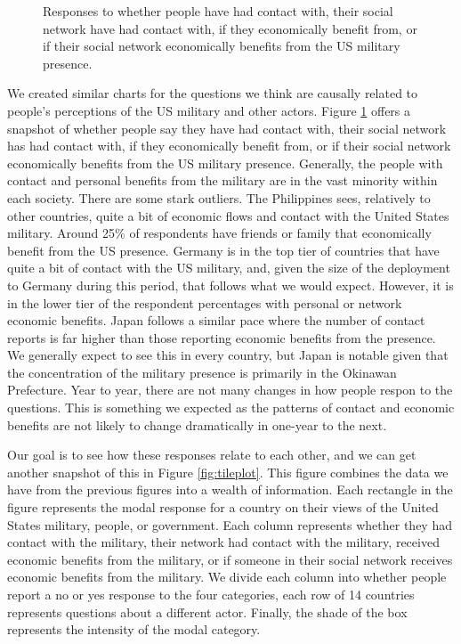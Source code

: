 \begin{figure}[t]
	\centering{}
	\caption{Responses to whether people have had contact with, their social network have had contact with, if they economically benefit from, or if their social network economically benefits from the US military presence.}
	\label{fig:ivdesc}
\end{figure} %
\FloatBarrier
We created similar charts for the questions we think are causally related to people's perceptions of the US military and other actors. Figure \ref{fig:ivdesc} offers a snapshot of whether people say they have had contact with, their social network has had contact with, if they economically benefit from, or if their social network economically benefits from the US military presence. Generally, the people with contact and personal benefits from the military are in the vast minority within each society. There are some stark outliers. The Philippines sees, relatively to other countries, quite a bit of economic flows and contact with the United States military. Around 25\% of respondents have friends or family that economically benefit from the US presence. Germany is in the top tier of countries that have quite a bit of contact with the US military, and, given the size of the deployment to Germany during this period, that follows what we would expect. However, it is in the lower tier of the respondent percentages with personal or network economic benefits. Japan follows a similar pace where the number of contact reports is far higher than those reporting economic benefits from the presence. We generally expect to see this in every country, but Japan is notable given that the concentration of the military presence is primarily in the Okinawan Prefecture. Year to year, there are not many changes in how people respon to the questions. This is something we expected as the patterns of contact and economic benefits are not likely to change dramatically in one-year to the next. %


Our goal is to see how these responses relate to each other, and we can get another snapshot of this in Figure \ref{fig:tileplot}. This figure combines the data we have from the previous figures into a wealth of information. Each rectangle in the figure represents the modal response for a country on their views of the United States military, people, or government. Each column represents whether they had contact with the military, their network had contact with the military, received economic benefits from the military, or if someone in their social network receives economic benefits from the military. We divide each column into whether people report a no or yes response to the four categories, each row of 14 countries represents questions about a different actor. Finally, the shade of the box represents the intensity of the modal category. 

